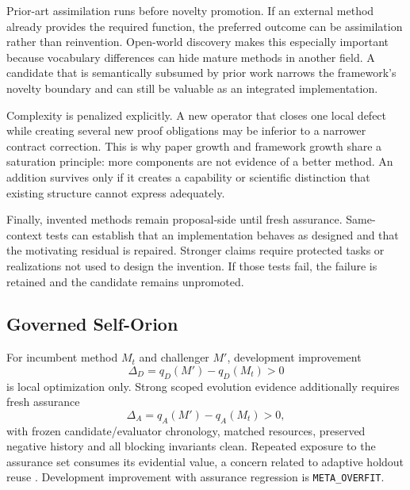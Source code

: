 Prior-art assimilation runs before novelty promotion. If an external method already provides the required function, the preferred outcome can be assimilation rather than reinvention. Open-world discovery makes this especially important because vocabulary differences can hide mature methods in another field. A candidate that is semantically subsumed by prior work narrows the framework's novelty boundary and can still be valuable as an integrated implementation.

Complexity is penalized explicitly. A new operator that closes one local defect while creating several new proof obligations may be inferior to a narrower contract correction. This is why paper growth and framework growth share a saturation principle: more components are not evidence of a better method. An addition survives only if it creates a capability or scientific distinction that existing structure cannot express adequately.

Finally, invented methods remain proposal-side until fresh assurance. Same-context tests can establish that an implementation behaves as designed and that the motivating residual is repaired. Stronger claims require protected tasks or realizations not used to design the invention. If those tests fail, the failure is retained and the candidate remains unpromoted.

\subsection{Governed Self-Orion}
For incumbent method $M_t$ and challenger $M'$, development improvement
\begin{equation}\Delta_D=q_D(M')-q_D(M_t)>0\end{equation}
is local optimization only. Strong scoped evolution evidence additionally requires fresh assurance
\begin{equation}\Delta_A=q_A(M')-q_A(M_t)>0,\end{equation}
with frozen candidate/evaluator chronology, matched resources, preserved negative history and all blocking invariants clean. Repeated exposure to the assurance set consumes its evidential value, a concern related to adaptive holdout reuse \cite{dwork2015}. Development improvement with assurance regression is \texttt{META\_OVERFIT}.

